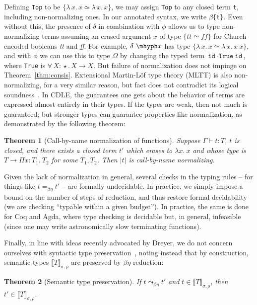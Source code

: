 \documentclass{article}
\newcommand{\abs}[4]{{#1}\, #2\! : \! #3.\, #4}
\newcommand{\absu}[3]{{#1}\, #2.\, #3}
\newcommand{\interp}[1]{\llbracket #1 \rrbracket}
\newtheorem{theorem}{Theorem}
\begin{document}
Defining \verb|Top| to be $\{\absu{\lambda}{x}{x} \simeq
\absu{\lambda}{x}{x}\}$, we may assign \verb|Top| to any closed term \verb|t|,
including non-normalizing ones. In our annotated syntax, we write
\texttt{\(\beta\)\{t\}}. Even without this, the presence of $\delta$ in
combination with $\phi$ allows us to type non-normalizing terms assuming an
erased argument $x$ of type $\{ \textit{tt} \simeq \textit{ff} \}$ for
Church-encoded booleans \textit{tt} and \textit{ff}. For example, $\delta\ \mhyph x$
has type \(\{\absu{\lambda}{x}{x} \simeq \absu{\lambda}{x}{x\ x}\}\), and with
$\phi$ we can use this to type $\Omega$ by changing the typed term
\(\texttt{id}\ \cdot\texttt{True}\ \texttt{id}\), where \verb|True| is
\(\abs{\forall}{X}{\star}{X \to X}\). But failure of normalization does not
impinge on Theorem~\ref{thm:consis}. Extensional Martin-L\"of type theory (MLTT)
is also non-normalizing, for a very similar reason, but fact does not contradict
its logical soundness~\cite{dybjer16}. In CDLE, the guarantees one gets about
the behavior of terms are expressed almost entirely in their types. If the types
are weak, then not much is guaranteed; but stronger types can guarantee
properties like normalization, as demonstrated by the following theorem:

\begin{theorem}[Call-by-name normalization of functions]
  \label{thm:cedille-termination}
  Suppose \(\Gamma\vdash t : T\), $t$ is closed, and there exists a closed term
  $t'$ which erases to \(\lambda x.\ x\) and whose type is $T \to \Pi x : T_1.\
  T_2$ for some $T_1, T_2$. Then $|t|$ is call-by-name normalizing.
  \end{theorem}

Given the lack of normalization in general, several checks in the typing rules --
for things like $t =_{\beta\eta} t'$ -- are formally undecidable.  In
practice, we simply impose a bound on the number of steps of reduction,
and thus restore formal decidability (we are checking ``typable within
a given budget'').  In practice, the same is done for Coq and Agda,
where type checking is decidable but, in general, infeasible (since one
may write astronomically slow terminating functions).

Finally, in line with ideas recently advocated by Dreyer, we
do not concern ourselves with syntactic
type preservation~\cite{dreyer18}, noting instead that by construction,
semantic types $\interp{T}_{\sigma,\rho}$ are preserved by $\beta\eta$-reduction:

  \begin{theorem}[Semantic type preservation]
    If $t \leadsto_{\beta\eta} t'$ and $t\in\interp{T}_{\sigma,\rho}$, then $t'\in\interp{T}_{\sigma,\rho}$.
    \end{theorem}
\end{document}

